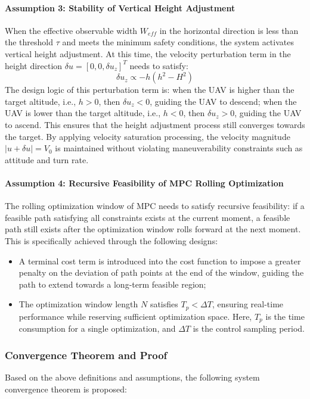 \documentclass[final,3p,times,numbers]{elsarticle}
\begin{document}
\paragraph{Assumption 3: Stability of Vertical Height Adjustment}
When the effective observable width $W_{eff}$ in the horizontal direction is less than the threshold $\tau$ and meets the minimum safety conditions, the system activates vertical height adjustment. At this time, the velocity perturbation term in the height direction $\delta u = [0, 0, \delta u_z]^T$ needs to satisfy:
\begin{equation}
\delta u_z \propto -h(h^2 - H^2) \label{eq:3-23}
\end{equation}
The design logic of this perturbation term is: when the UAV is higher than the target altitude, i.e., $h>0$, then $\delta u_z < 0$, guiding the UAV to descend; when the UAV is lower than the target altitude, i.e., $h<0$, then $\delta u_z > 0$, guiding the UAV to ascend. This ensures that the height adjustment process still converges towards the target. By applying velocity saturation processing, the velocity magnitude $|u+\delta u| = V_0$ is maintained without violating maneuverability constraints such as attitude and turn rate.

\paragraph{Assumption 4: Recursive Feasibility of MPC Rolling Optimization}
The rolling optimization window of MPC needs to satisfy recursive feasibility: if a feasible path satisfying all constraints exists at the current moment, a feasible path still exists after the optimization window rolls forward at the next moment. This is specifically achieved through the following designs:
\begin{itemize}
    \item A terminal cost term is introduced into the cost function to impose a greater penalty on the deviation of path points at the end of the window, guiding the path to extend towards a long-term feasible region;
    \item The optimization window length $N$ satisfies $T_p < \Delta T$, ensuring real-time performance while reserving sufficient optimization space. Here, $T_p$ is the time consumption for a single optimization, and $\Delta T$ is the control sampling period.
\end{itemize}

\subsubsection{Convergence Theorem and Proof}
Based on the above definitions and assumptions, the following system convergence theorem is proposed:
\end{document}
